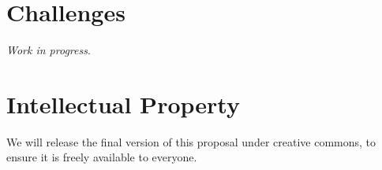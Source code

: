 \section{Challenges}				%

{\it Work in progress}.

%
%




%
%
%
	
\section {Intellectual Property}	
We will release the final version of this proposal under creative commons, to ensure it is freely available to everyone.

{}



